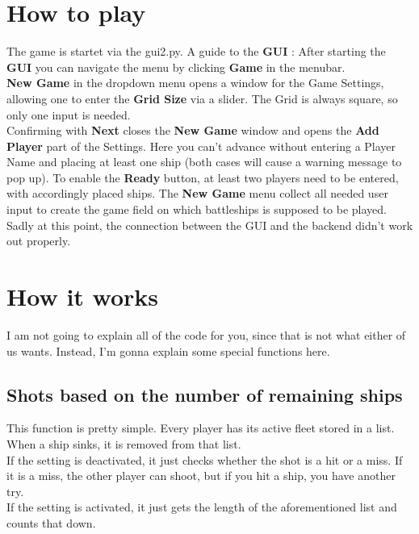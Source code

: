 \documentclass[12pt]{scrartcl}
\begin{document}
	\section{How to play}\label{sec:how_to_play}
	The game is startet via the gui2.py.
	A guide to the \textbf{GUI }: After starting the \textbf{GUI }you can navigate the menu by clicking \textbf{Game} in the menubar.\\
	\textbf{New Game} in the dropdown menu opens a window for the Game Settings, allowing one to enter the \textbf{Grid Size} via a slider. The Grid is always square, so only one input is needed. \\
	Confirming with\textbf{ Next }closes the \textbf{New Game} window and opens the \textbf{Add Player} part of the Settings. Here you can't advance without entering a Player Name and placing at least one ship (both cases will cause a warning message to pop up). To enable the \textbf{Ready} button, at least two players need to be entered, with accordingly placed ships. 
	The \textbf{New Game }menu collect all needed user input to create the game field on which battleships is supposed to be played.\\
	Sadly at this point, the connection between the GUI and the backend didn't work out properly.

	\clearpage


	\section{How it works}\label{sec:how_it_works}
	I am not going to explain all of the code for you, since that is not what either of us wants. Instead, I'm gonna explain some special functions here.

	\subsection{Shots based on the number of remaining ships}
	This function is pretty simple. Every player has its active fleet stored in a list. When a ship sinks, it is removed from that list. \\
	If the setting is deactivated, it just checks whether the shot is a hit or a miss. If it is a miss, the other player can shoot, but if you hit a ship, you have another try.\\
	If the setting is activated, it just gets the length of the aforementioned list and counts that down.
\end{document}
